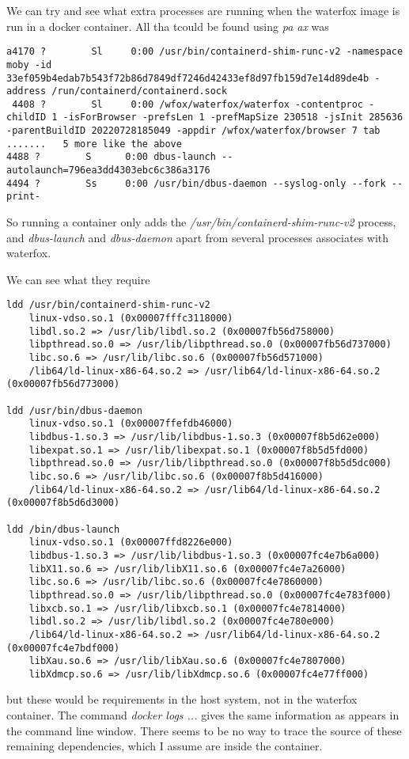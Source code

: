 \documentclass[a4paper]{article}  %
\begin{document}
We can try and see what extra processes are running when the waterfox image is run in a docker container. All tha tcould be found using {\em pa ax} was
\begin{tcolorbox}
\begin{verbatim}
a4170 ?        Sl     0:00 /usr/bin/containerd-shim-runc-v2 -namespace moby -id 33ef059b4edab7b543f72b86d7849df7246d42433ef8d97fb159d7e14d89de4b -address /run/containerd/containerd.sock
 4408 ?        Sl     0:00 /wfox/waterfox/waterfox -contentproc -childID 1 -isForBrowser -prefsLen 1 -prefMapSize 230518 -jsInit 285636 -parentBuildID 20220728185049 -appdir /wfox/waterfox/browser 7 tab
.......   5 more like the above
4488 ?        S      0:00 dbus-launch --autolaunch=796ea3dd4303ebc6c386a3176
4494 ?        Ss     0:00 /usr/bin/dbus-daemon --syslog-only --fork --print-
\end{verbatim}
\end{tcolorbox}
 So running a container only adds the {\em /usr/bin/containerd-shim-runc-v2} process, and {\em dbus-launch} and {\em dbus-daemon} apart from several processes associates with waterfox.

We can see what they require
\begin{tcolorbox}
\begin{verbatim}
ldd /usr/bin/containerd-shim-runc-v2
	linux-vdso.so.1 (0x00007fffc3118000)
	libdl.so.2 => /usr/lib/libdl.so.2 (0x00007fb56d758000)
	libpthread.so.0 => /usr/lib/libpthread.so.0 (0x00007fb56d737000)
	libc.so.6 => /usr/lib/libc.so.6 (0x00007fb56d571000)
	/lib64/ld-linux-x86-64.so.2 => /usr/lib64/ld-linux-x86-64.so.2 (0x00007fb56d773000)

ldd /usr/bin/dbus-daemon
	linux-vdso.so.1 (0x00007ffefdb46000)
	libdbus-1.so.3 => /usr/lib/libdbus-1.so.3 (0x00007f8b5d62e000)
	libexpat.so.1 => /usr/lib/libexpat.so.1 (0x00007f8b5d5fd000)
	libpthread.so.0 => /usr/lib/libpthread.so.0 (0x00007f8b5d5dc000)
	libc.so.6 => /usr/lib/libc.so.6 (0x00007f8b5d416000)
	/lib64/ld-linux-x86-64.so.2 => /usr/lib64/ld-linux-x86-64.so.2 (0x00007f8b5d6d3000)

ldd /bin/dbus-launch
	linux-vdso.so.1 (0x00007ffd8226e000)
	libdbus-1.so.3 => /usr/lib/libdbus-1.so.3 (0x00007fc4e7b6a000)
	libX11.so.6 => /usr/lib/libX11.so.6 (0x00007fc4e7a26000)
	libc.so.6 => /usr/lib/libc.so.6 (0x00007fc4e7860000)
	libpthread.so.0 => /usr/lib/libpthread.so.0 (0x00007fc4e783f000)
	libxcb.so.1 => /usr/lib/libxcb.so.1 (0x00007fc4e7814000)
	libdl.so.2 => /usr/lib/libdl.so.2 (0x00007fc4e780e000)
	/lib64/ld-linux-x86-64.so.2 => /usr/lib64/ld-linux-x86-64.so.2 (0x00007fc4e7bdf000)
	libXau.so.6 => /usr/lib/libXau.so.6 (0x00007fc4e7807000)
	libXdmcp.so.6 => /usr/lib/libXdmcp.so.6 (0x00007fc4e77ff000)

\end{verbatim}
\end{tcolorbox}
but these would be requirements in the host system, not in the waterfox container.
The command {\em docker logs ...} gives the same information as appears in the command line window.  There seems to be no way  to trace the source of these remaining dependencies, which I assume are inside the container.
\end{document}
